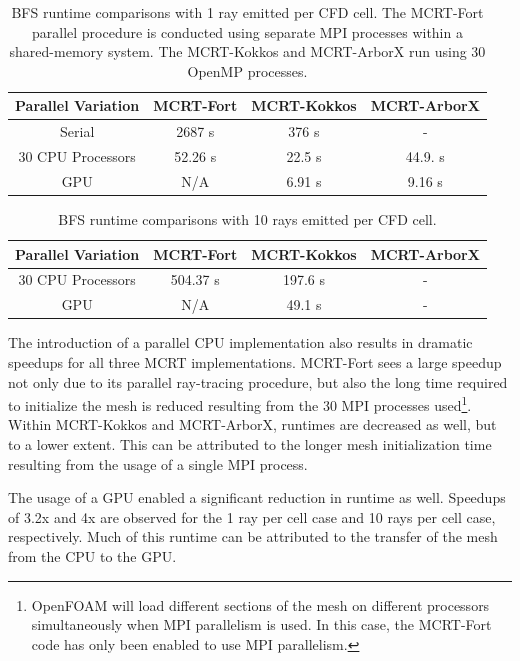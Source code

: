 \begin{table}[h!]
\centering
\caption{BFS runtime comparisons with 1 ray emitted per CFD cell. The MCRT-Fort parallel procedure is conducted using separate MPI processes within a shared-memory system. The MCRT-Kokkos and MCRT-ArborX run using 30 OpenMP processes.}
\begin{tabular}{||c c c c||} 
 \hline
 Parallel Variation & MCRT-Fort & MCRT-Kokkos & MCRT-ArborX \\ [0.5ex] 
 \hline\hline
 Serial & 2687 s & 376 s & - \\ 
 30 CPU Processors & 52.26 s & 22.5 s & 44.9. s \\
 GPU & N/A & 6.91 s & 9.16 s \\
 \hline
\end{tabular}
\label{table:BFS_runtime_table_1rpc}
\end{table}

\begin{table}[h!]
\centering
\caption{BFS runtime comparisons with 10 rays emitted per CFD cell.}
\begin{tabular}{||c c c c||} 
 \hline
 Parallel Variation & MCRT-Fort & MCRT-Kokkos & MCRT-ArborX \\ [0.5ex] 
 \hline\hline
 30 CPU Processors & 504.37 s & 197.6 s & - \\
 GPU & N/A & 49.1 s & - \\
 \hline
\end{tabular}
\label{table:BFS_runtime_table_10rpc}
\end{table}


The introduction of a parallel CPU implementation also results in dramatic speedups for all three MCRT implementations. MCRT-Fort sees a large speedup not only due to its parallel ray-tracing procedure, but also the long time required to initialize the mesh is reduced resulting from the 30 MPI processes used\footnote{OpenFOAM will load different sections of the mesh on different processors simultaneously when MPI parallelism is used. In this case, the MCRT-Fort code has only been enabled to use MPI parallelism.}.
Within MCRT-Kokkos and MCRT-ArborX, runtimes are decreased as well, but to a lower extent. This can be attributed to the longer mesh initialization time resulting from the usage of a single MPI process.

The usage of a GPU enabled a significant reduction in runtime as well. Speedups of 3.2x and 4x are observed for the 1 ray per cell case and 10 rays per cell case, respectively.
Much of this runtime can be attributed to the transfer of the mesh from the CPU to the GPU.



